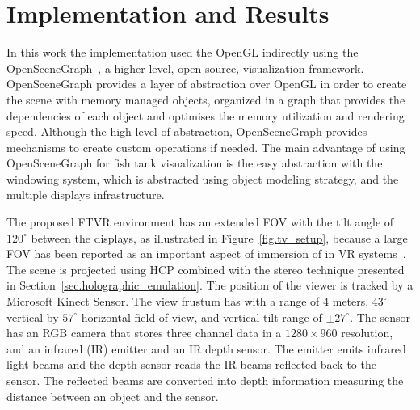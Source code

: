 \section{Implementation and Results}
\label{sec.results}

In this work the implementation used the OpenGL indirectly using the OpenSceneGraph~\cite{Burns2004}, a higher level, open-source, visualization framework. OpenSceneGraph provides a layer of abstraction over OpenGL in order to create the scene with memory managed objects, organized in a graph that provides the dependencies of each object and optimises the memory utilization and rendering speed. Although the high-level of abstraction, OpenSceneGraph provides mechanisms to create custom operations if needed. The main advantage of using OpenSceneGraph for fish tank visualization is the easy abstraction with the windowing system, which is abstracted using object modeling strategy, and the multiple displays infrastructure.

The proposed FTVR environment has an extended FOV with the tilt angle of $120^{\circ}$ between the displays, as illustrated in Figure~\ref{fig.tv_setup}, because a large FOV has been reported as an important aspect of immersion of in VR systems~\cite{Hounsell2013}. The scene is projected using HCP combined with the stereo technique presented in Section~\ref{sec.holographic_emulation}. The position of the viewer is tracked by a Microsoft Kinect Sensor. The view frustum has with a range of 4 meters, $43^{\circ}$ vertical by $57^{\circ}$ horizontal field of view, and vertical tilt range of $\pm 27^{\circ}$. The sensor has an RGB camera that stores three channel data in a $1280 \times 960$ resolution, and an infrared (IR) emitter and an IR depth sensor. The emitter emits infrared light beams and the depth sensor reads the IR beams reflected back to the sensor. The reflected beams are converted into depth information measuring the distance between an object and the sensor. 


